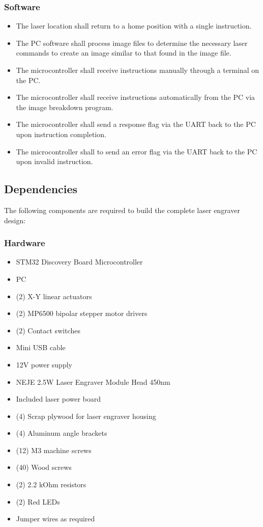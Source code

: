 \documentclass[11pt]{LaTeX-Classes/math-hw}
\begin{document}
\subsubsection*{Software}
	\begin{itemize}
		\item The laser location shall return to a home position with a single instruction.
		\item The PC software shall process image files to determine the necessary laser commands to create an image similar to that found in the image file.
		\item The microcontroller shall receive instructions manually through a terminal on the PC.
		\item The microcontroller shall receive instructions automatically from the PC via the image breakdown program.
		\item The microcontroller shall send a response flag via the UART back to the PC upon instruction completion.
		\item The microcontroller shall to send an error flag via the UART back to the PC upon invalid instruction.
	\end{itemize}

\subsection{Dependencies}
The following components are required to build the complete laser engraver design:
\subsubsection*{Hardware}
\begin{itemize}
	\item STM32 Discovery Board Microcontroller
	\item PC
	\item (2) X-Y linear actuators
	\item (2) MP6500 bipolar stepper motor drivers
	\item (2) Contact switches
	\item Mini USB cable
	\item 12V power supply
	\item NEJE 2.5W Laser Engraver Module Head 450nm 
	\item Included laser power board
	\item (4) Scrap plywood for laser engraver housing
	\item (4) Aluminum angle brackets
	\item (12) M3 machine screws
	\item (40) Wood screws
	\item (2) 2.2 kOhm resistors
	\item (2) Red LEDs
	\item Jumper wires as required
\end{itemize}
\end{document}
